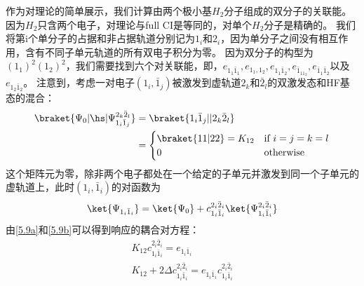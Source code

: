 作为对理论的简单展示，我们计算由两个极小基$H_2$分子组成的双分子的关联能。因为$H_2$只含两个电子，对理论与full CI是等同的，对单个$H_2$分子是精确的。
我们将第i个单分子的占据和非占据轨道分别记为$1_i$和$2_i$，因为单分子之间没有相互作用，含有不同子单元轨道的所有双电子积分为零。
因为双分子的构型为$(1_1)^2(1_2)^2$，我们需要找到六个对关联能，即，$e_{1_1\bar{1}_1}, e_{1_1,1_2}, e_{1_1\bar{1}_2}, e_{\bar{1}_11_2}, e_{\bar{1}_1\bar{1}_2}$以及$e_{1_2\bar{1}_2}$。
注意到，考虑一对电子$(1_i,\bar{1}_j)$被激发到虚轨道$2_k$和$\bar{2}_l$的双激发态和HF基态的混合：
\begin{align}
    \braket{\Psi_0|\hs|\Psi^{2_k\bar{2}_l}_{1_i\bar{1}_j}}&=\braket{1_i\bar{1}_j||2_k\bar{2}_l}\notag\\
    &=\begin{cases}
        \braket{11|22}=K_{12} & \text{if } i=j=k=l\\
        0 & \text{otherwise}
    \end{cases}
\end{align}
这个矩阵元为零，除非两个电子都处在一个给定的子单元并激发到同一个子单元的虚轨道上，此时$(1_i,\bar{1}_i)$的对函数为
\begin{align}
    \ket{\Psi_{1_i\bar{1}_i}}=\ket{\Psi_0}+c_{1_i\bar{1}_i}^{2_i\bar{2}_i}\ket{\Psi_{1_i\bar{1}_i}^{2_i\bar{2}_i}}
\end{align}
由\autoref{5.9a}和\autoref{5.9b}可以得到响应的耦合对方程：
\begin{align}
    K_{12}c_{1_i\bar{1}_i}^{2_i\bar{2}_i}=e_{1_i\bar{1}_i}\tag{5.22a}\label{5.22a}\\
    K_{12}+2\Delta c_{1_i\bar{1}_i}^{2_i\bar{2}_i}=e_{1_i\bar{1}_i} c_{1_i\bar{1}_i}^{2_i\bar{2}_i}\tag{5.22b}\label{5.22b}
\end{align}
